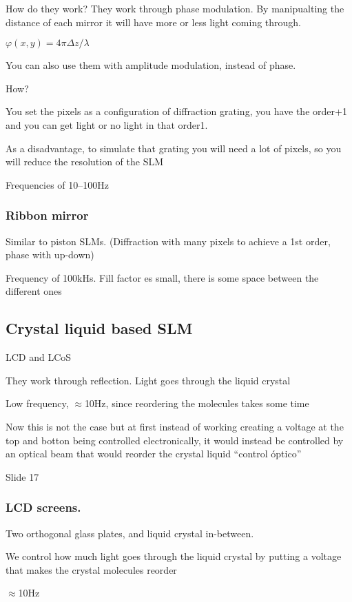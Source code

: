\documentclass[../main/main.tex]{subfiles}
\begin{document}
How do they work? They work through phase modulation. By manipualting the distance of each mirror it will have more or less light coming through.

$\varphi(x,y) = 4 \pi \Delta z / \lambda$

You can also use them with amplitude modulation, instead of phase.

How?

You set the pixels as a configuration of diffraction grating, you have the order+1 and you can get light or no light in that order1.

As a disadvantage, to simulate that grating you will need a lot of pixels, so you will reduce the resolution of the SLM

Frequencies of 10--100Hz

\subsubsection{Ribbon mirror}

Similar to piston SLMs. (Diffraction with many pixels to achieve a 1st order, phase with up-down)

Frequency of 100kHs. Fill factor es small, there is some space between the different ones

\subsection{Crystal liquid based SLM}

LCD and LCoS

They work through reflection. Light goes through the liquid crystal

Low frequency, $\approx$10Hz, since reordering the molecules takes some time

Now this is not the case but at first instead of working creating a voltage at the top and botton being controlled electronically, it would instead be controlled by an optical beam that would reorder the crystal liquid ``control óptico''


Slide 17
\subsubsection{LCD screens.}
Two orthogonal glass plates, and liquid crystal in-between.

We control how much light goes through the liquid crystal by putting a voltage that makes the crystal molecules reorder

$\approx$10Hz
\end{document}
